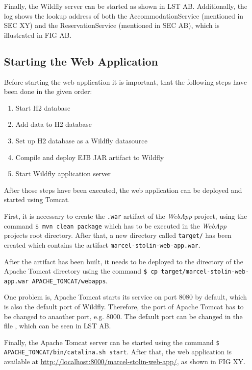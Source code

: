 Finally, the Wildfly server can be started as shown in LST AB. Additionally, the log shows the lookup address of both the AccommodationService (mentioned in SEC XY) and the ReservationService (mentioned in SEC AB), which is illustrated in FIG AB.


\subsection{Starting the Web Application}
Before starting the web application it is important, that the following steps have been done in the given order:
\begin{enumerate}
\item Start H2 database
\item Add data to H2 database
\item Set up H2 database as a Wildfly datasource
\item Compile and deploy EJB JAR artifact to Wildfly
\item Start Wildfly application server
\end{enumerate}

After those steps have been executed, the web application can be deployed and started using Tomcat.

First, it is necessary to create the \texttt{.war} artifact of the \textit{WebApp} project, using the command \texttt{\$ mvn clean package} which has to be executed in the \textit{WebApp} projects root directory. After that, a new directory called \texttt{target/} has been created which contains the artifact \texttt{marcel-stolin-web-app.war}.

After the artifact has been built, it needs to be deployed to the  directory of the Apache Tomcat directory using the command \texttt{\$ cp target/marcel-stolin-web-app.war APACHE\_TOMCAT/webapps}.

One problem is, Apache Tomcat starts its service on port 8080 by default, which is also the default port of Wildfly. Therefore, the port of Apache Tomcat has to be changed to anaother port, e.g. 8000. The default port can be changed in the file , which can be seen in LST AB.

Finally, the Apache Tomcat server can be started using the command \texttt{\$ APACHE\_TOMCAT/bin/catalina.sh start}. After that, the web application is available at \url{http://localhost:8000/marcel-stolin-web-app/}, as shown in FIG XY.
